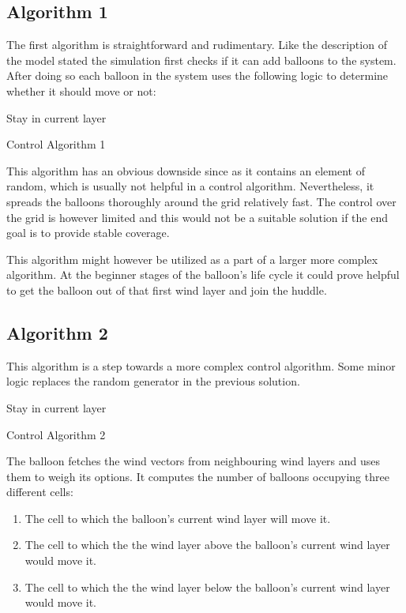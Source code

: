 \subsection{Algorithm 1}
The first algorithm is straightforward and rudimentary. Like the description of the model stated the simulation first checks if it can add balloons to the system. After doing so each balloon in the system uses the following logic to determine whether it should move or not:

\begin{algorithm}[H]
 \Else
 {Stay in current layer}
 \caption{Control Algorithm 1}
 \label{alg1}
\end{algorithm}

This algorithm has an obvious downside since as it contains an element of random, which is usually not helpful in a control algorithm. Nevertheless, it spreads the balloons thoroughly around the grid relatively fast. The control over the grid is however limited and this would not be a suitable solution if the end goal is to provide stable coverage.

This algorithm might however be utilized as a part of a larger more complex algorithm. At the beginner stages of the balloon's life cycle it could prove helpful to get the balloon out of that first wind layer and join the huddle.  

\subsection{Algorithm 2}
This algorithm is a step towards a more complex control algorithm. Some minor logic replaces the random generator in the previous solution. 

\begin{algorithm}[H]
 \Else
 {Stay in current layer}
 \caption{Control Algorithm 2}
 \label{alg2}
\end{algorithm}

The balloon fetches the wind vectors from neighbouring wind layers and uses them to weigh its options. It computes the number of balloons occupying three different cells:
\begin{enumerate}
\item The cell to which the balloon's current wind layer will move it.
\item The cell to which the the wind layer above the balloon's current wind layer would move it.
\item The cell to which the the wind layer below the balloon's current wind layer would move it.
\end{enumerate}

